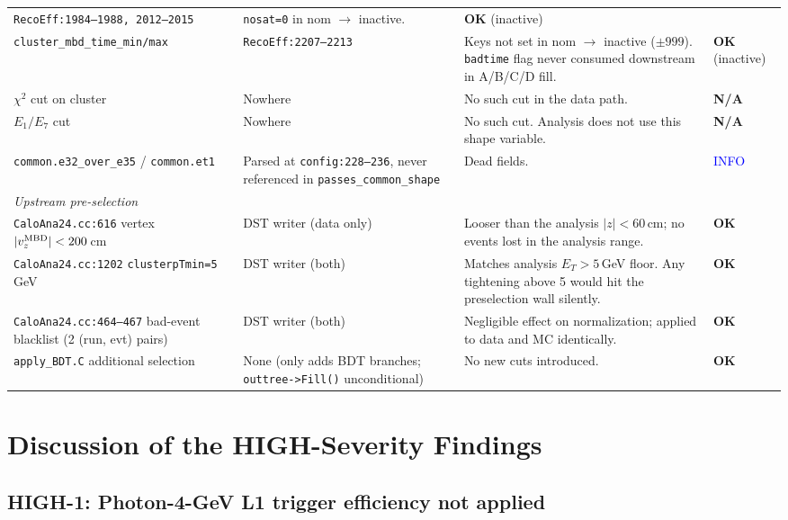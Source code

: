 \documentclass[11pt,a4paper]{article}
\newcommand{\info}[1]{\textcolor{blue}{#1}}
\newcommand{\ok}[1]{\textcolor{green!50!black}{\textbf{#1}}}
\begin{document}
\begin{longtable}{@{}p{4.0cm}p{4.2cm}p{5.5cm}p{3.2cm}@{}}
\texttt{RecoEff:1984--1988, 2012--2015} &
\texttt{nosat=0} in nom $\rightarrow$ inactive. &
\ok{OK} (inactive) \\
\addlinespace
\texttt{cluster\_mbd\_time\_min/max} &
\texttt{RecoEff:2207--2213} &
Keys not set in nom $\rightarrow$ inactive ($\pm 999$). \texttt{badtime}
flag never consumed downstream in A/B/C/D fill. &
\ok{OK} (inactive) \\
\addlinespace
$\chi^2$ cut on cluster &
Nowhere &
No such cut in the data path. &
\ok{N/A} \\
\addlinespace
$E_1/E_7$ cut &
Nowhere &
No such cut. Analysis does not use this shape variable. &
\ok{N/A} \\
\addlinespace
\texttt{common.e32\_over\_e35} /
\texttt{common.et1} &
Parsed at \texttt{config:228--236}, never referenced in \texttt{passes\_common\_shape} &
Dead fields. &
\info{INFO} \\
\midrule
\multicolumn{4}{l}{\textit{Upstream pre-selection}} \\
\midrule
\texttt{CaloAna24.cc:616} vertex $|v_z^{\rm MBD}|<200$\,cm &
DST writer (data only) &
Looser than the analysis $|z|<60$\,cm; no events lost in the analysis
range. &
\ok{OK} \\
\addlinespace
\texttt{CaloAna24.cc:1202} \texttt{clusterpTmin=5} GeV &
DST writer (both) &
Matches analysis $E_T > 5$\,GeV floor. Any tightening above 5 would
hit the preselection wall silently. &
\ok{OK} \\
\addlinespace
\texttt{CaloAna24.cc:464--467} bad-event blacklist (2 (run, evt) pairs) &
DST writer (both) &
Negligible effect on normalization; applied to data and MC identically. &
\ok{OK} \\
\addlinespace
\texttt{apply\_BDT.C} additional selection &
None (only adds BDT branches; \texttt{outtree->Fill()} unconditional) &
No new cuts introduced. &
\ok{OK} \\
\bottomrule
\end{longtable}

\section{Discussion of the HIGH-Severity Findings}

\subsection{HIGH-1: Photon-4-GeV L1 trigger efficiency not applied}
\end{document}
